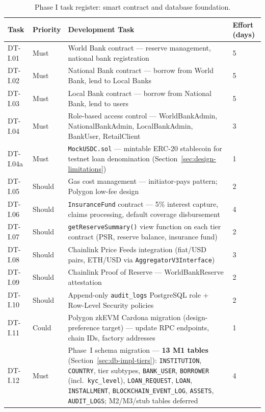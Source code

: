 \documentclass[12pt,a4paper]{report}
\newcommand{\tableheadcolor}{\rowcolor{TableHeadBg}}
\begin{document}
\begin{table}[H]
\centering
\caption[Phase I task register]{Phase I task register: smart contract and database foundation.}
\label{tab:phaseI-contracts}
\small
\begin{tabular}{p{1.8cm}p{1.8cm}p{7.5cm}p{1.5cm}}
\toprule
\tableheadcolor
\textbf{Task} & \textbf{Priority} & \textbf{Development Task} & \textbf{Effort (days)} \\
\midrule
DT-I.01 & Must & World Bank contract --- reserve management, national bank registration & 5 \\
DT-I.02 & Must & National Bank contract --- borrow from World Bank, lend to Local Banks & 5 \\
DT-I.03 & Must & Local Bank contract --- borrow from National Bank, lend to users & 5 \\
DT-I.04 & Must & Role-based access control --- WorldBankAdmin, NationalBankAdmin, LocalBankAdmin, BankUser, RetailClient & 3 \\
DT-I.04a & Must & \texttt{MockUSDC.sol} --- mintable ERC-20 stablecoin for testnet loan denomination (Section~\ref{sec:design-limitations}) & 1 \\
DT-I.05 & Should & Gas cost management --- initiator-pays pattern; Polygon low-fee design & 2 \\
DT-I.06 & Should & \texttt{InsuranceFund} contract --- 5\% interest capture, claims processing, default coverage disbursement & 4 \\
DT-I.07 & Should & \texttt{getReserveSummary()} view function on each tier contract (PSR, reserve balance, insurance fund) & 2 \\
DT-I.08 & Should & Chainlink Price Feeds integration (fiat/USD pairs, ETH/USD via \texttt{AggregatorV3Interface}) & 3 \\
DT-I.09 & Should & Chainlink Proof of Reserve --- WorldBankReserve attestation & 2 \\
DT-I.10 & Should & Append-only \texttt{audit\_logs} PostgreSQL role + Row-Level Security policies & 2 \\
DT-I.11 & Could & Polygon zkEVM Cardona migration (design-preference target) --- update RPC endpoints, chain IDs, factory addresses & 1 \\
DT-I.12 & Must & Phase~I schema migration --- \textbf{13 M1 tables} (Section~\ref{sec:db-impl-tiers}): \texttt{INSTITUTION}, \texttt{COUNTRY}, tier subtypes, \texttt{BANK\_USER}, \texttt{BORROWER} (incl.\ \texttt{kyc\_level}), \texttt{LOAN\_REQUEST}, \texttt{LOAN}, \texttt{INSTALLMENT}, \texttt{BLOCKCHAIN\_EVENT\_LOG}, \texttt{ASSETS}, \texttt{AUDIT\_LOGS}; M2/M3/stub tables deferred & 4 \\

\end{tabular}
\end{table}
\end{document}
